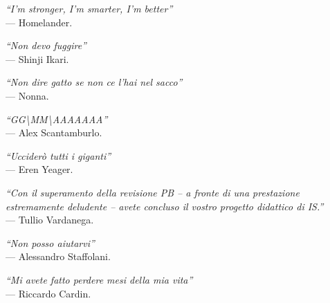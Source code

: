 \cleardoublepage
{}
{}

\begin{flushright}{
    \slshape
    ``I'm stronger, I'm smarter, I'm better''} \\
    \medskip
    --- Homelander.
\end{flushright}

\begin{flushright}{
    \slshape
    ``Non devo fuggire''} \\
    \medskip
    --- Shinji Ikari.
\end{flushright}
\begin{flushright}{
    \slshape
    ``Non dire gatto se non ce l'hai nel sacco''} \\
    \medskip
    --- Nonna.
\end{flushright}
\begin{flushright}{
    \slshape
    ``GG\textbackslash{}MM\textbackslash{}AAAAAAA''} \\
    \medskip
    --- Alex Scantamburlo.
\end{flushright}

\begin{flushright}{
    \slshape
    ``Ucciderò tutti i giganti''} \\
    \medskip
    --- Eren Yeager.
\end{flushright}


\begin{flushright}{
    \slshape
    ``Con il superamento della revisione PB -- a fronte di una prestazione estremamente deludente -- avete concluso il vostro progetto didattico di IS.''} \\
    \medskip
    --- Tullio Vardanega.
\end{flushright}

\begin{flushright}{
    \slshape
    ``Non posso aiutarvi''} \\
    \medskip
    --- Alessandro Staffolani.
\end{flushright}

\begin{flushright}{
    \slshape
    ``Mi avete fatto perdere mesi della mia vita''} \\
    \medskip
    --- Riccardo Cardin.
\end{flushright}



\bigskip

\begingroup
\let\clearpage\relax
\let\cleardoublepage\relax
\let\cleardoublepage\relax

